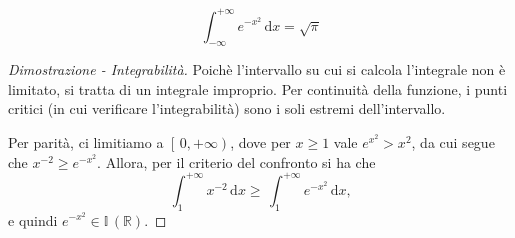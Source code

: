 \begin{Res}
	\label{res_1}
	\begin{equation*}
		\, \int_{- \infty}^{+ \infty}e^{-x^2} \, \mathrm{d}x = \sqrt{ \pi}
	\end{equation*}
\end{Res}
\begin{proof}[Dimostrazione - Integrabilità]
	Poichè l'intervallo su cui si calcola l'integrale non è limitato, si tratta di un integrale improprio. 
	Per continuità della funzione, i punti critici (in cui verificare l'integrabilità) sono i soli estremi dell'intervallo.

	Per parità, ci limitiamo a $ \left[ \,0,+ \infty \right)$, dove per $x \geq 1$ vale $e^{x^2} > x^2$, da cui segue che $x^{-2} \geq e^{-x^2}$. 
	Allora, per il criterio del confronto si ha che 
	\begin{equation*}
		\, \int_{1}^{+ \infty} x^{-2} \, \mathrm{d}x \geq \, \int_{1}^{+ \infty} e^{-x^2} \, \mathrm{d}x, 
	\end{equation*}
	e quindi $e^{-x^2} \in \mathbb{I} \,( \mathbb{R})$.
\end{proof}

